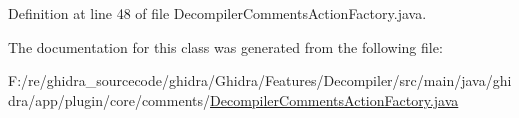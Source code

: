 Definition at line 48 of file Decompiler\+Comments\+Action\+Factory.\+java.



The documentation for this class was generated from the following file\+:\begin{DoxyCompactItemize}
\item 
F\+:/re/ghidra\+\_\+sourcecode/ghidra/\+Ghidra/\+Features/\+Decompiler/src/main/java/ghidra/app/plugin/core/comments/\mbox{\hyperlink{_decompiler_comments_action_factory_8java}{Decompiler\+Comments\+Action\+Factory.\+java}}\end{DoxyCompactItemize}
